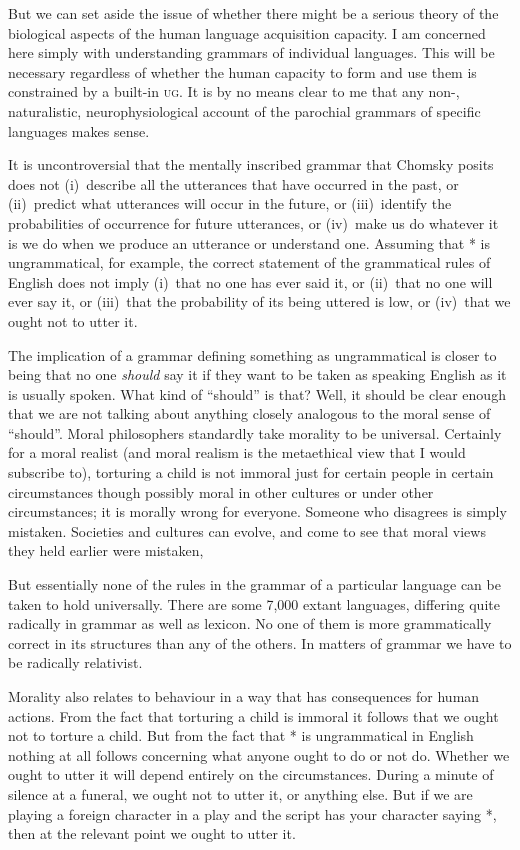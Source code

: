 \documentclass[output=paper]{langscibook}
\begin{document}
But we can set aside the issue of whether there might be a serious theory of the biological aspects of the human language acquisition capacity. I am concerned here simply with understanding grammars of individual languages. This will be necessary regardless of whether the human capacity to form and use them is constrained by a built-in \textsc{ug}.  It is by no means clear to me that any non-, naturalistic, neurophysiological account of the parochial grammars of specific languages makes sense.

It is uncontroversial that the mentally inscribed grammar that Chomsky posits does not (i)~describe all the utterances that have occurred in the past, or (ii)~predict what utterances will occur in the future, or (iii)~identify the probabilities of occurrence for future utterances, or (iv)~make us do whatever it is we do when we produce an utterance or understand one.  Assuming that * is ungrammatical, for example, the correct statement of the grammatical rules of English does not imply (i)~that no one has ever said it, or (ii)~that no one will ever say it, or (iii)~that the probability of its being uttered is low, or (iv)~that we ought not to utter it.

The implication of a grammar defining something as ungrammatical is closer to being that no one \emph{should} say it if they want to be taken as speaking English as it is usually spoken.  What kind of ``should'' is that? Well, it should be clear enough that we are not talking about anything closely analogous to the moral sense of ``should''.  Moral philosophers standardly take morality to be universal.  Certainly for a moral realist (and moral realism is the metaethical view that I would subscribe to), torturing a child is not immoral just for certain people in certain circumstances though possibly moral in other cultures or under other circumstances; it is morally wrong for everyone.  Someone who disagrees is simply mistaken. Societies and cultures can evolve, and come to see that moral views they held earlier were mistaken,

But essentially none of the rules in the grammar of a particular language can be taken to hold universally. There are some 7,000 extant languages, differing quite radically in grammar as well as lexicon.  No one of them is more grammatically correct in its structures than any of the others. In matters of grammar we have to be radically relativist.

Morality also relates to behaviour in a way that has consequences for human actions.  From the fact that torturing a child is immoral it follows that we ought not to torture a child.  But from the fact that * is ungrammatical in English nothing at all follows concerning what anyone ought to do or not do.  Whether we ought to utter it will depend entirely on the circumstances.  During a minute of silence at a funeral, we ought not to utter it, or anything else.  But if we are playing a foreign character in a play and the script has your character saying *, then at the relevant point we ought to utter it.
\end{document}
